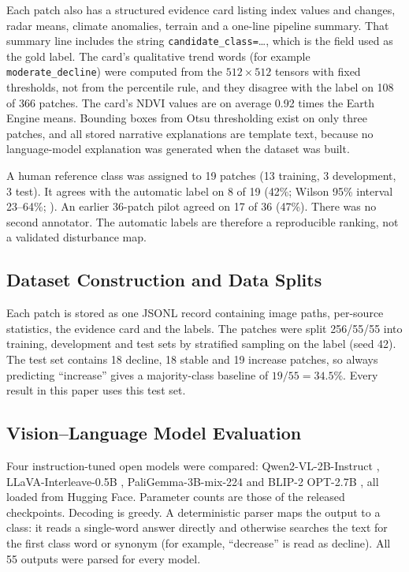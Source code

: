 \documentclass[11pt]{article}
\begin{document}
Each patch also has a structured evidence card listing index values and
changes, radar means, climate anomalies, terrain and a one-line pipeline
summary. That summary line includes the string
\texttt{candidate\_class=}\ldots, which is the field used as the gold
label. The card's qualitative trend words (for example
\texttt{moderate\_decline}) were computed from the $512 \times 512$
tensors with fixed thresholds, not from the percentile rule, and they
disagree with the label on 108 of 366 patches. The card's NDVI values
are on average 0.92 times the Earth Engine means. Bounding boxes from
Otsu thresholding exist on only three patches, and all stored narrative
explanations are template text, because no language-model explanation
was generated when the dataset was built.

A human reference class was assigned to 19 patches (13 training, 3
development, 3 test). It agrees with the automatic label on 8 of 19
(42\%; Wilson 95\% interval 23--64\%; \citealp{wilson1927}). An earlier
36-patch pilot agreed on 17 of 36 (47\%). There was no second
annotator. The automatic labels are therefore a reproducible ranking,
not a validated disturbance map.

\subsection{Dataset Construction and Data Splits}

Each patch is stored as one JSONL record containing image paths,
per-source statistics, the evidence card and the labels. The patches
were split 256/55/55 into training, development and test sets by
stratified sampling on the label (seed 42). The test set contains 18
decline, 18 stable and 19 increase patches, so always predicting
``increase'' gives a majority-class baseline of $19/55 = 34.5\%$. Every
result in this paper uses this test set.

\subsection{Vision--Language Model Evaluation}

Four instruction-tuned open models were compared:
Qwen2-VL-2B-Instruct \citep{wang2024qwen2vl},
LLaVA-Interleave-0.5B \citep{li2024interleave},
PaliGemma-3B-mix-224 \citep{beyer2024} and
BLIP-2 OPT-2.7B \citep{li2023blip2,zhang2022opt}, all loaded from
Hugging Face. Parameter counts are those of the released checkpoints.
Decoding is greedy. A deterministic parser maps the output to a class:
it reads a single-word answer directly and otherwise searches the text
for the first class word or synonym (for example, ``decrease'' is read
as decline). All 55 outputs were parsed for every model.
\end{document}
